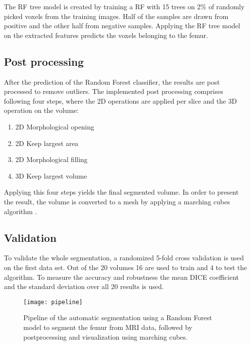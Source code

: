The RF tree model is created by training a RF with 15 trees on 2\% of randomly picked voxels from the training images. Half of the samples are drawn from positive and the other half from negative samples. Applying the RF tree model on the extracted features predicts the voxels belonging to the femur.
\subsection{Post processing}
After the prediction of the Random Forest classifier, the results are post processed to remove outliers. The implemented post processing comprises following four steps, where the 2D operations are applied per slice and the 3D operation on the volume:
\begin{enumerate}
\item 2D Morphological opening
\item 2D Keep largest area
\item 2D Morphological filling
\item 3D Keep largest volume
\end{enumerate}
Applying this four steps yields the final segmented volume. In order to present the result, the volume is converted to a mesh by applying a marching cubes algorithm \cite{lorensen}. 
\subsection{Validation}
To validate the whole segmentation, a randomized 5-fold cross validation \cite{cross} is used on the first data set. Out of the 20 volumes 16 are used to train and 4 to test the algorithm. To measure the accuracy and robustness the mean DICE coefficient\cite{powers2011evaluation} and the standard deviation over all 20 results is used.
\begin{figure*}[!t]
\centering
\texttt{[image: pipeline]}
\caption{Pipeline of the automatic segmentation using a Random Forest model to segment the femur from MRI data, followed by postprocessing and visualization using marching cubes.}
\label{fig:pipeline}
\end{figure*}

